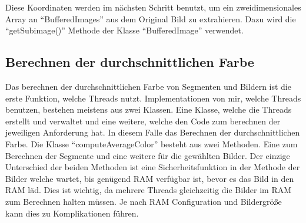 Diese Koordinaten werden im nächsten Schritt benutzt, um ein zweidimensionales Array an ``BufferedImages'' aus dem Original Bild zu extrahieren. Dazu wird die ``getSubimage()'' Methode der Klasse ``BufferedImage'' verwendet.

\subsection{Berechnen der durchschnittlichen Farbe}
Das berechnen der durchschnittlichen Farbe von Segmenten und Bildern ist die erste Funktion, welche Threads nutzt. Implementationen von mir, welche Threads benutzen, bestehen meistens aus zwei Klassen. Eine Klasse, welche die Threads erstellt und verwaltet und eine weitere, welche den Code zum berechnen der jeweiligen Anforderung hat. In diesem Falle das Berechnen der durchschnittlichen Farbe. Die Klasse ``computeAverageColor'' besteht aus zwei Methoden. Eine zum Berechnen der Segmente und eine weitere für die gewählten Bilder. Der einzige Unterschied der beiden Methoden ist eine Sicherheitsfunktion in der Methode der Bilder welche wartet, bis genügend RAM verfügbar ist, bevor es das Bild in den RAM läd. Dies ist wichtig, da mehrere Threads gleichzeitig die Bilder im RAM zum Berechnen halten müssen. Je nach RAM Configuration und Bildergröße kann dies zu Komplikationen führen.